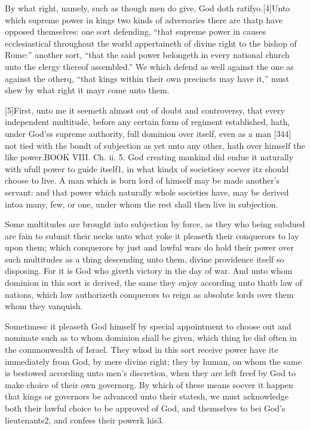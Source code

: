 By what right, namely, such as though men do give, God doth ratifyo.[4]Unto which supreme power in kings two kinds of adversaries there are thatp have opposed themselves: one sort defending, “that supreme power in causes ecclesiastical throughout the world appertaineth of divine right to the bishop of Rome:” another sort, “that the said power belongeth in every national church unto the clergy thereof assembled.” We which defend as well against the one as against the otherq, “that kings within their own precincts may have it,” must shew by what right it mayr come unto them.

[5]First, unto me it seemeth almost out of doubt and controversy, that every independent multitude, before any certain form of regiment established, hath, under God’ss supreme authority, full dominion over itself, even as a man [344] not tied with the bondt of subjection as yet unto any other, hath over himself the like power.BOOK VIII. Ch. ii. 5. God creating mankind did endue it naturally with ufull power to guide itself1, in what kindx of societiesy soever itz should choose to live. A man which is born lord of himself may be made another’s servant: and that power which naturally whole societies have, may be derived intoa many, few, or one, under whom the rest shall then live in subjection.

Some multitudes are brought into subjection by force, as they who being subdued are fain to submit their necks unto what yoke it pleaseth their conquerors to lay upon them; which conquerors by just and lawful wars do hold their power over such multitudes as a thing descending unto them, divine providence itself so disposing. For it is God who giveth victory in the day of war. And unto whom dominion in this sort is derived, the same they enjoy according unto thatb law of nations, which law authorizeth conquerors to reign as absolute lords over them whom they vanquish.

Sometimesc it pleaseth God himself by special appointment to choose out and nominate such as to whom dominion shall be given, which thing he did often in the commonwealth of Israel. They whod in this sort receive power have ite immediately from God, by mere divine right; they by human, on whom the same is bestowed according unto men’s discretion, when they are left freef by God to make choice of their own governorg. By which of these means soever it happen that kings or governors be advanced unto their statesh, we must acknowledge both their lawful choice to be approved of God, and themselves to bei God’s lieutenants2, and confess their powerk his3.

